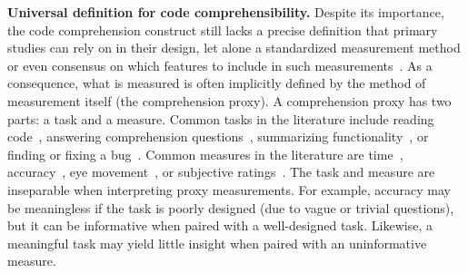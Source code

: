 \textbf{Universal definition for code comprehensibility.} Despite its importance, the code comprehension construct still lacks a precise definition that primary studies can rely on in their design, let alone a standardized measurement method or even consensus on which features to include in such measurements~\cite{chin2026put, Wyrich:ACS23}.
As a consequence, what is measured is often implicitly defined by the method of measurement itself (\ie the comprehension proxy). A comprehension proxy has two parts: a task and a measure.
Common tasks in the literature include reading code~\cite{Karas:TSE2024}, answering comprehension questions~\cite{Park:ESE24, Peitek:ICPC20, Abdelsalam:ESE2026, Gao:EASE2025}, summarizing functionality~\cite{Karas:TSE2024,Peitek:ICPC20, Flint:2026}, or finding or fixing a bug~\cite{Nielebock:ESE2019, Flint:2026}.
Common measures in the literature are time~\cite{Nielebock:ESE2019, Peitek:ICPC20, Peitek:ICSE2021, Karas:TSE2024, Park:ESE24, Alakmeh:ASE2024, Elfares:2025, Abdelsalam:ESE2026}, accuracy~\cite{Nielebock:ESE2019, Peitek:ICPC20, Peitek:ICSE2021, Ribeiro:ESE23, Karas:TSE2024, Park:ESE24, Alakmeh:ASE2024, Elfares:2025, Flint:2026, Abdelsalam:ESE2026}, eye movement~\cite{Peitek:ICPC20, Abbad-Andaloussi:ICPC22, Park:ESE24, Elfares:2025, Abdelsalam:ESE2026, Flint:2026}, or subjective ratings~\cite{Peitek:ICSE2021, Ribeiro:ESE23, Alakmeh:ASE2024, Elfares:2025, Bergum:TOSEM2026, Abdelsalam:ESE2026}.
The task and measure are inseparable when interpreting proxy measurements. For example, accuracy may be meaningless if the task is poorly designed (\eg due to vague or trivial questions),
but it can be informative when paired with a well-designed task. Likewise, a meaningful task may yield little insight when paired with an uninformative measure.

